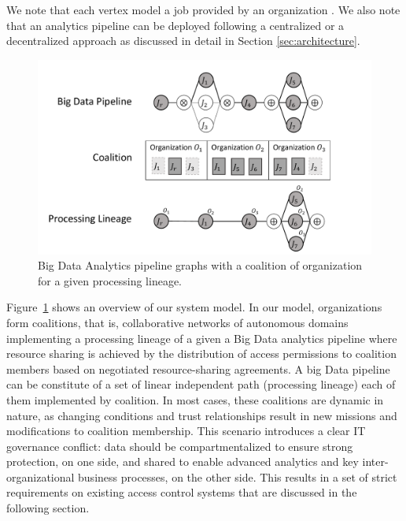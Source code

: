 We note that each vertex  model a job  provided by an organization .
We also note that an analytics pipeline can be deployed following a centralized or a decentralized approach as discussed in detail in Section \ref{sec:architecture}.

\begin{figure}[!t]
  \includegraphics[width=0.98\columnwidth]{generaleFig1.pdf}
  \caption{Big Data Analytics pipeline graphs with a coalition of organization for a given processing lineage.}\label{fig:BDpipeline}
\end{figure}

Figure~\ref{fig:BDpipeline} shows an overview of our system model.
In our model, organizations form coalitions, that is, collaborative networks of autonomous domains implementing a processing lineage of a given a Big Data analytics pipeline where resource sharing is achieved by the distribution of access permissions to coalition members based on negotiated resource-sharing agreements.
A big Data pipeline can be constitute of a set of linear independent path (processing lineage) each of them implemented by coalition. In most cases, these coalitions are dynamic in nature, as changing conditions and trust relationships result in new missions and modifications to coalition membership.
This scenario introduces a clear IT governance conflict: data should be compartmentalized to ensure strong protection, on one side, and shared to enable advanced analytics and key inter-organizational business processes, on the other side.
This results in a set of strict requirements on existing access control systems that are discussed in the following section.




